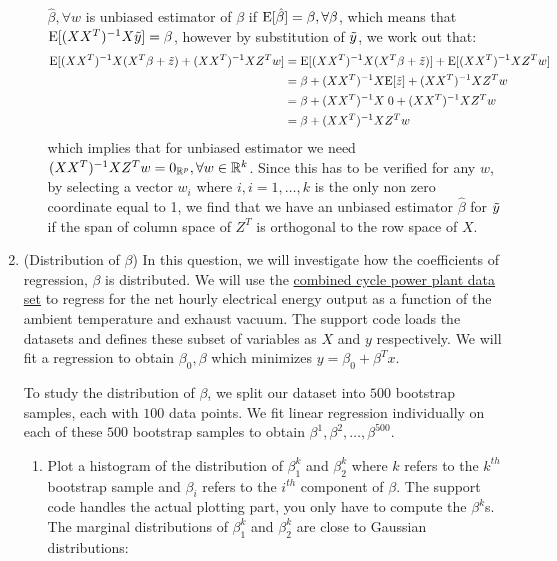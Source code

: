 \documentclass[12pt,twoside]{article}
\begin{document}
\begin{enumerate}
\begin{enumerate}
    \medskip
     $\hat{\beta}, \forall w$ is unbiased estimator of $\beta$ if $\mathrm{E}[\hat{\beta}] = \beta, \forall \beta$, which means that
     $\mathrm{E}[ (XX^T)^{-1}X\tilde{  y } ] = \beta$, however by substitution of $\tilde{  y }$, we work out that: 
      \begin{align*}
      	\mathrm{E}[ (XX^T)^{-1}X  (X^T \beta + \tilde{  z }) + (XX^T)^{-1}X  Z^T w]	&=	\mathrm{E}[ (XX^T)^{-1}X  (X^T \beta + \tilde{  z })] + \mathrm{E}[(XX^T)^{-1}X  Z^T w] \\
												&=	 \beta + (XX^T)^{-1}X \mathrm{E}[\tilde{  z }]	+  (XX^T)^{-1}X  Z^T w \\
												&=	\beta + (XX^T)^{-1}X \; 0 + (XX^T)^{-1}X  Z^T w \\
												&= 	\beta + (XX^T)^{-1}X  Z^T w 
      \end{align*}
      which implies that for unbiased estimator we need $(XX^T)^{-1}X  Z^T w = 0_{\mathbb{R}^p}, \forall w \in \mathbb{R}^k$.
      Since this has to be verified for any $w$,
      by selecting a vector $w_i$ where $i, i=1, \ldots, k$ is the only non zero coordinate equal to 1, we find that we have an unbiased estimator $\hat{\beta}$ for $\tilde{  y }$ 
      if the span of column space of $Z^T$ is orthogonal to the row space of $X$.
    
  \end{enumerate}   

 \newpage
   
\item (Distribution of $\beta$)  In this question, we will investigate how the coefficients of regression, $\beta$ is distributed. We will use the \href{https://archive.ics.uci.edu/ml/datasets/Combined+Cycle+Power+Plant}{combined cycle power plant data set} to regress for the net hourly electrical energy output as a function of the ambient temperature and exhaust vacuum. The support code loads the datasets and defines these subset of variables as $X$ and $y$ respectively. We will fit a regression to obtain $\beta_0, \beta$ which minimizes $y = \beta_0 + \beta^Tx$. 

To study the distribution of $\beta$, we split our dataset into $500$ bootstrap samples, each with $100$ data points. We fit linear regression individually on each of these $500$ bootstrap samples to obtain $\beta^1, \beta^2, \dots, \beta^{500}$.
\begin{enumerate}
\item Plot a histogram of the distribution of $\beta_1^k$ and $\beta_2^k$ where $k$ refers to the $k^{th}$ bootstrap sample and $\beta_i$ refers to the $i^{th}$ component of $\beta$.  The support code handles the actual plotting part, you only have to compute the $\beta^k$s. \\
\medskip
The marginal distributions of $\beta_1^k$ and $\beta_2^k$ are close to Gaussian distributions:



\end{enumerate}
\end{enumerate}
\end{document}
